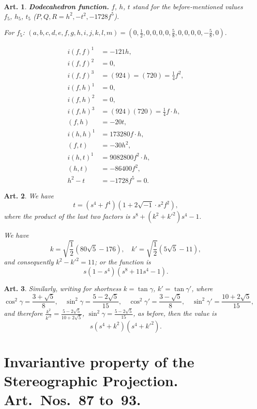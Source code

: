 \documentclass[11pt,a4paper]{article}
\theoremstyle{plain}
\newtheorem{art}{Art.}[section]
\begin{document}
\begin{art}
\textbf{Dodecahedron function.} $f$, $h$, $t$ stand for the before-mentioned
values $f_5$, $h_5$, $t_5$ ($P, Q, R = h^2, -t^2, -1728f^5$).

For $f_5$: $(a, b, c, d, e, f, g, h, i, j, k, l, m) = (0, \frac{1}{2}, 0, 0, 0, 0, \frac{5}{8}, 0, 0, 0, 0, -\frac{5}{8}, 0)$.

\begin{align*}
i(f,f)^1 &= -121h, \\
i(f,f)^2 &= 0, \\
i(f,f)^3 &= (924) = (720) = \frac{1}{4}f^2, \\
i(f,h)^1 &= 0, \\
i(f,h)^2 &= 0, \\
i(f,h)^3 &= (924)(720) = \frac{1}{4}f\cdot h, \\
(f,h) &= -20t, \\
i(h,h)^1 &= 173280f\cdot h, \\
(f,t) &= -30h^2, \\
i(h,t)^1 &= 9082800f^2\cdot h, \\
(h,t) &= -86400f^2, \\
h^2 - t &= -1728f^5 = 0.
\end{align*}
\end{art}

\begin{art}
We have
\[
t = (s^4 + f^4)(1 + 2\sqrt{-1} \cdot s^2 f^2),
\]
where the product of the last two factors is $s^8 + (k^2 + k'^2)s^4 - 1$.

We have
\[
k = \sqrt{\frac{1}{2}}(80\sqrt{5} - 176), \quad k' = \sqrt{\frac{1}{2}}(5\sqrt{5} - 11),
\]
and consequently $k^2 - k'^2 = 11$; or the function is
\[
s(1-s^4)(s^8 + 11s^4 - 1).
\]
\end{art}

\begin{art}
Similarly, writing for shortness $k = \tan\gamma$, $k' = \tan\gamma'$, where
\[
\cos^2\gamma = \frac{3+\sqrt{5}}{8}, \quad \sin^2\gamma = \frac{5-2\sqrt{5}}{15}, \quad
\cos^2\gamma' = \frac{3-\sqrt{5}}{8}, \quad \sin^2\gamma' = \frac{10+2\sqrt{5}}{15},
\]
and therefore $\frac{k^2}{k'^2} = \frac{5-2\sqrt{5}}{10+2\sqrt{5}}$, $\sin^2\gamma = \frac{5-2\sqrt{5}}{15}$, as before, then the
value is
\[
s(s^4 + k^2)(s^4 + k'^2).
\]
\end{art}

\section*{Invariantive property of the Stereographic Projection.
Art.~Nos.~87 to~93.}
\end{document}
